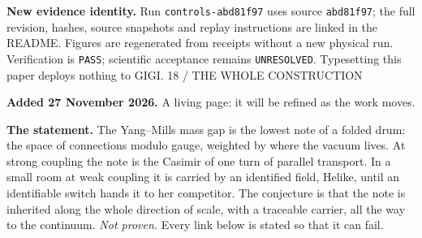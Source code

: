\documentclass[11pt,letterpaper]{article}
\theoremstyle{plain}
\theoremstyle{definition}
\newcommand{\eyebrow}[1]{{\sffamily\small\color{teal}#1}\par}
\newcommand{\pagetitle}[2]{\eyebrow{#1}\vspace{3pt}{\LARGE #2}\par\vspace{5pt}}
\begin{document}
\textbf{New evidence identity.}
Run \texttt{controls-abd81f97} uses source \texttt{abd81f97}; the full revision,
hashes, source snapshots and replay instructions are linked in the README.
Figures are regenerated from receipts without a new physical run. Verification
is \texttt{PASS}; scientific acceptance remains \texttt{UNRESOLVED}.
Typesetting this paper deploys nothing to GIGI.
\newpage
\pagetitle{18 / THE WHOLE CONSTRUCTION}{One statement, complete enough to be wrong}
{\small\color{teal}\textbf{Added 27 November 2026.} A living page: it will be refined as the work moves.}\par\smallskip
\textbf{The statement.} The Yang--Mills mass gap is the lowest note of a folded
drum: the space of connections modulo gauge, weighted by where the vacuum
lives. At strong coupling the note is the Casimir of one turn of parallel
transport. In a small room at weak coupling it is carried by an identified
field, Helike, until an identifiable switch hands it to her competitor. The
conjecture is that the note is inherited along the whole direction of scale,
with a traceable carrier, all the way to the continuum. \emph{Not proven.}
Every link below is stated so that it can fail.
\end{document}
